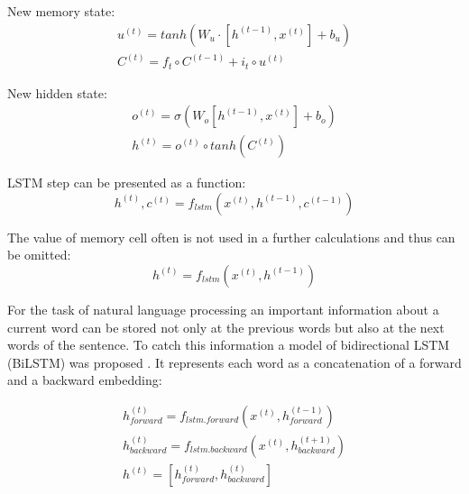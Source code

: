 New memory state:
\begin{equation}
\begin{gathered}
u^{(t)} = tanh(W_u\cdot[h^{(t-1)}, x^{(t)}]+b_u) \\

C^{(t)} = f_t\circ C^{(t-1)}+i_t\circ u^{(t)}
\end{gathered}
\label{lstm:c}
\end{equation} 

New hidden state:
\begin{equation}
\begin{gathered}
o^{(t)}=\sigma(W_o[h^{(t-1)},x^{(t)}]+b_o) \\

h^{(t)}=o^{(t)}\circ tanh(C^{(t)})
\end{gathered}
\label{lstm:h}
\end{equation} 

LSTM step can be presented as a function:
\begin{equation}
h^{(t)}, c^{(t)} = f_{lstm}(x^{(t)}, h^{(t-1)}, c^{(t-1)})
\end{equation}

The value of memory cell often is not used in a further calculations and thus can be omitted:
\begin{equation}
h^{(t)} = f_{lstm}(x^{(t)}, h^{(t-1)})
\end{equation}

For the task of natural language processing an important information about a current word can be stored not only at the previous words but also at the next words of the sentence. To catch this information a model of bidirectional LSTM (BiLSTM) was proposed  \parencite{schuster1997, graves2005}. It represents each word as a concatenation of a forward and a backward embedding:

\begin{equation}
\begin{gathered}
h_{forward}^{(t)} = f_{lstm.forward}(x^{(t)}, h^{(t-1)}_{forward}) \\
h_{backward}^{(t)} = f_{lstm.backward}(x^{(t)}, h^{(t+1)}_{backward}) \\

h^{(t)} = [h_{forward}^{(t)}, h_{backward}^{(t)} ]
\end{gathered}
\end{equation}

